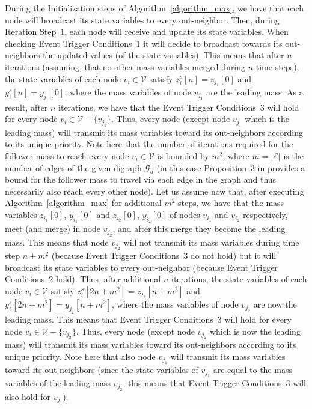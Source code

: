 \documentclass[twocolumn]{autart}    %
\begin{document}
\begin{pf}
During the Initialization steps of Algorithm~\ref{algorithm_max}, we have that each node will broadcast its state variables to every out-neighbor. 
Then, during Iteration Step~$1$, each node will receive and update its state variables. 
When checking Event Trigger Conditions~$1$ it will decide to broadcast towards its out-neighbors the updated values (of the state variables). 
This means that after $n$ iterations (assuming, that no other mass variables merged during $n$ time steps), the state variables of each node $v_i \in \mathcal{V}$ satisfy $z^s_i[n] = z_{j_1}[0]$ and $y^s_i[n] = y_{j_1}[0]$, 
where the mass variables of node $v_{j_1}$ are the leading mass. 
As a result, after $n$ iterations, we have that the Event Trigger Conditions~$3$ will hold for every node $v_i \in \mathcal{V} - \{ v_{j_1} \}$. 
Thus, every node (except node $v_{j_1}$ which is the leading mass) will transmit its mass variables toward its out-neighbors according to its unique priority. 
Note here that the number of iterations required for the follower mass to reach every node $v_i \in \mathcal{V}$ is bounded by $m^2$, where $m = | \mathcal{E} |$ is the number of edges of the given digraph $\mathcal{G}_d$ (in this case Proposition~$3$ in \cite{2014:RikosHadj} provides a bound for the follower mass to travel via each edge in the graph and thus necessarily also reach every other node).
Let us assume now that, after executing Algorithm~\ref{algorithm_max} for additional $m^2$ steps, we have that the mass variables $z_{i_1}[0]$, $y_{i_1}[0]$ and $z_{i_2}[0]$, $y_{i_2}[0]$ of nodes $v_{i_1}$ and $v_{i_2}$ respectively, meet (and merge) in node $v_{j_2}$, and after this merge they become the leading mass.  
This means that node $v_{j_2}$ will not transmit its mass variables during time step $n + m^2$ (because Event Trigger Conditions~$3$ do not hold) but it will broadcast its state variables to every out-neighbor (because Event Trigger Conditions~$2$ hold). 
Thus, after additional $n$ iterations, the state variables of each node $v_i \in \mathcal{V}$ satisfy $z^s_i[2n + m^2] = z_{j_2}[n + m^2]$ and $y^s_i[2n + m^2] = y_{j_2}[n + m^2]$, where the mass variables of node $v_{j_2}$ are now the leading mass. 
This means that Event Trigger Conditions~$3$ will hold for every node $v_i \in \mathcal{V} - \{ v_{j_2} \}$. 
Thus, every node (except node $v_{j_2}$ which is now the leading mass) will transmit its mass variables toward its out-neighbors according to its unique priority. 
Note here that also node $v_{j_1}$ will transmit its mass variables toward its out-neighbors (since the state variables of $v_{j_1}$ are equal to the mass variables of the leading mass $v_{j_2}$, this means that Event Trigger Conditions~$3$ will also hold for $v_{j_1}$). 

\end{pf}
\end{document}
